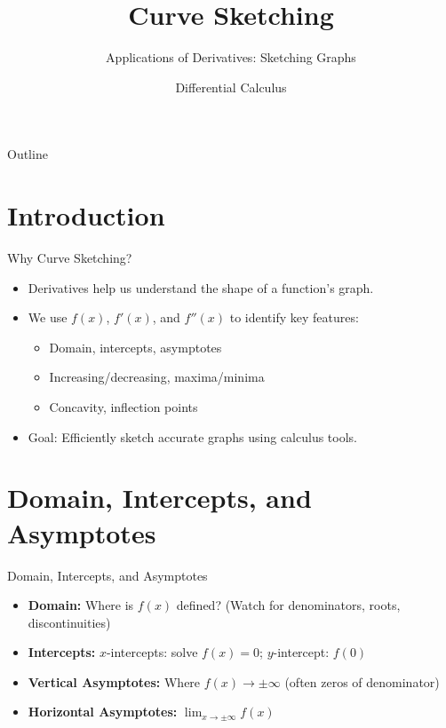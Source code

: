 \documentclass[aspectratio=169]{beamer}
\title{Curve Sketching}
\subtitle{Applications of Derivatives: Sketching Graphs}
\author{Differential Calculus}
\date{}
\begin{document}
\begin{frame}
\titlepage
\end{frame}

\begin{frame}{Outline}
\tableofcontents
\end{frame}

\section{Introduction}

\begin{frame}{Why Curve Sketching?}
\begin{itemize}
    \item Derivatives help us understand the shape of a function's graph.
    \item We use $f(x)$, $f'(x)$, and $f''(x)$ to identify key features:
    \begin{itemize}
        \item Domain, intercepts, asymptotes
        \item Increasing/decreasing, maxima/minima
        \item Concavity, inflection points
    \end{itemize}
    \item Goal: Efficiently sketch accurate graphs using calculus tools.
\end{itemize}
\end{frame}

\section{Domain, Intercepts, and Asymptotes}

\begin{frame}{Domain, Intercepts, and Asymptotes}
\begin{itemize}
    \item \textbf{Domain:} Where is $f(x)$ defined? (Watch for denominators, roots, discontinuities)
    \item \textbf{Intercepts:} $x$-intercepts: solve $f(x)=0$; $y$-intercept: $f(0)$
    \item \textbf{Vertical Asymptotes:} Where $f(x)\to\pm\infty$ (often zeros of denominator)
    \item \textbf{Horizontal Asymptotes:} $\lim_{x\to\pm\infty} f(x)$
\end{itemize}
\end{frame}
\end{document}
